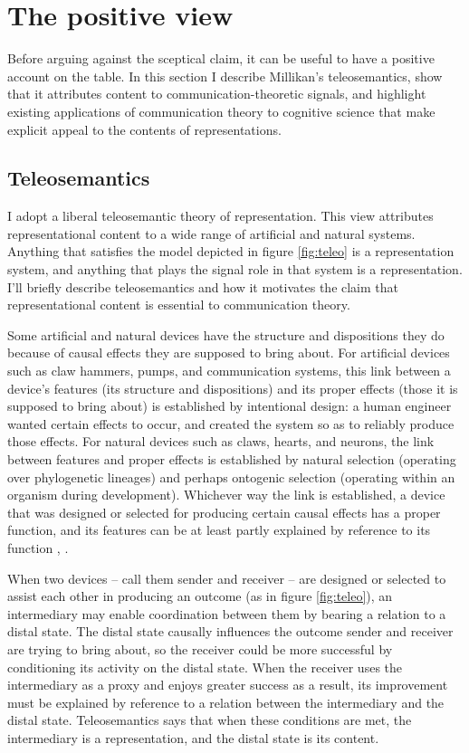 \documentclass[12pt]{article}
\begin{document}
\section{The positive view}\label{sec:positive}

Before arguing against the sceptical claim, it can be useful to have a positive account on the table.
In this section I describe Millikan's teleosemantics, show that it attributes content to communication-theoretic signals, and highlight existing applications of communication theory to cognitive science that make explicit appeal to the contents of representations.

\subsection{Teleosemantics}
I adopt a liberal teleosemantic theory of representation.
This view attributes representational content to a wide range of artificial and natural systems.
Anything that satisfies the model depicted in figure \ref{fig:teleo} is a representation system, and anything that plays the signal role in that system is a representation.
I'll briefly describe teleosemantics and how it motivates the claim that representational content is essential to communication theory.



Some artificial and natural devices have the structure and dispositions they do because of causal effects they are supposed to bring about.
For artificial devices such as claw hammers, pumps, and communication systems, this link between a device's features (its structure and dispositions) and its proper effects (those it is supposed to bring about) is established by intentional design: a human engineer wanted certain effects to occur, and created the system so as to reliably produce those effects.
For natural devices such as claws, hearts, and neurons, the link between features and proper effects is established by natural selection (operating over phylogenetic lineages) and perhaps ontogenic selection (operating within an organism during development).
Whichever way the link is established, a device that was designed or selected for producing certain causal effects has a proper function, and its features can be at least partly explained by reference to its function \citep[$\S\S$1-2]{millikan1984language}, \citep[$\S$2]{millikan1993white}.

When two devices -- call them sender and receiver -- are designed or selected to assist each other in producing an outcome (as in figure \ref{fig:teleo}), an intermediary may enable coordination between them by bearing a relation to a distal state.
The distal state causally influences the outcome sender and receiver are trying to bring about, so the receiver could be more successful by conditioning its activity on the distal state.
When the receiver uses the intermediary as a proxy and enjoys greater success as a result, its improvement must be explained by reference to a relation between the intermediary and the distal state.
Teleosemantics says that when these conditions are met, the intermediary is a representation, and the distal state is its content.
\end{document}
